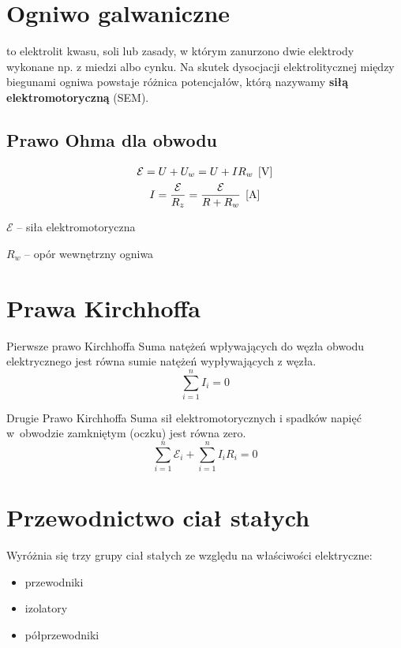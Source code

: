 \section{Ogniwo galwaniczne}
\begin{definition}
   to elektrolit kwasu, soli lub zasady, w którym zanurzono dwie elektrody
  wykonane np. z miedzi albo cynku. Na skutek dysocjacji elektrolitycznej między biegunami ogniwa
  powstaje różnica potencjałów, którą nazywamy \textbf{siłą elektromotoryczną} (SEM).
\end{definition}

\subsection{Prawo Ohma dla obwodu}
\begin{gather*}
  \mathcal E = U + U_w = U + IR_w \;\left[\mathrm{V}\right]\\
  I = \frac{\mathcal E}{R_z} = \frac{\mathcal E}{R + R_w} \;\left[\mathrm{A}\right]
\end{gather*}
\begin{symbols}
  \item $\mathcal E$ -- siła elektromotoryczna
  \item $R_w$ -- opór wewnętrzny ogniwa
\end{symbols}

\section{Prawa Kirchhoffa}
\begin{law}{Pierwsze prawo Kirchhoffa}
  Suma natężeń wpływających do węzła obwodu elektrycznego jest równa sumie natężeń wypływających z węzła.
  \begin{equation}
    \sum_{i=1}^n I_i = 0
  \end{equation}
\end{law}

\begin{law}{Drugie Prawo Kirchhoffa}
  Suma sił elektromotorycznych i spadków napięć w~obwodzie zamkniętym (oczku) jest równa zero.
  \begin{equation}
    \sum_{i=1}^n \mathcal E_i + \sum_{i=1}^n I_i R_i = 0
  \end{equation}
\end{law}

\section{Przewodnictwo ciał stałych}
Wyróżnia się trzy grupy ciał stałych ze względu na właściwości elektryczne:
\begin{itemize}
  \item przewodniki
  \item izolatory
  \item półprzewodniki
\end{itemize}

